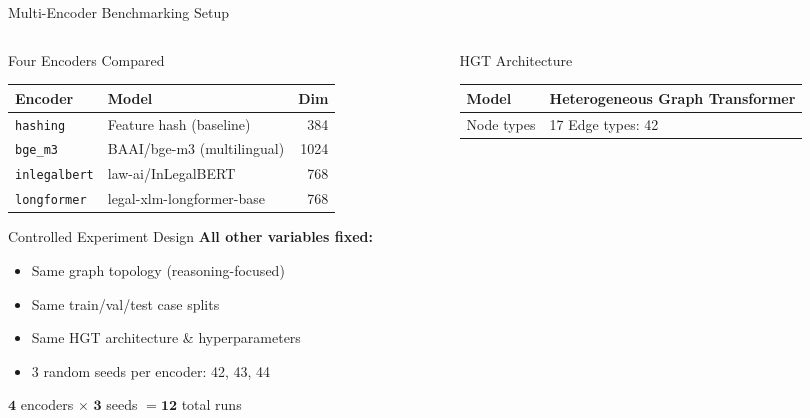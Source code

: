\documentclass[aspectratio=169, 9pt]{beamer}
\begin{document}
\begin{frame}{Multi-Encoder Benchmarking Setup}
  \begin{columns}[T]
    \begin{column}{0.50\textwidth}
      \begin{block}{Four Encoders Compared}
        \scriptsize\renewcommand{\arraystretch}{1.2}
        \begin{tabular}{p{1.8cm}p{3.2cm}r}
          \toprule
          \textbf{Encoder} & \textbf{Model} & \textbf{Dim}\\
          \midrule
          \texttt{hashing}     & Feature hash (baseline)     & 384\\
          \texttt{bge\_m3}     & BAAI/bge-m3 (multilingual)  & 1024\\
          \texttt{inlegalbert} & law-ai/InLegalBERT          & 768\\
          \texttt{longformer}  & legal-xlm-longformer-base   & 768\\
          \bottomrule
        \end{tabular}
      \end{block}
      \vspace{5pt}
      \begin{block}{Controlled Experiment Design}
        \small\textbf{All other variables fixed:}
        \begin{itemize}\scriptsize\setlength\itemsep{1pt}
          \item Same graph topology (reasoning-focused)
          \item Same train/val/test case splits
          \item Same HGT architecture \& hyperparameters
          \item 3 random seeds per encoder: 42, 43, 44
        \end{itemize}
        \vspace{3pt}
        $\mathbf{4}$ encoders $\times$ $\mathbf{3}$ seeds $= \mathbf{12}$ total runs
      \end{block}
    \end{column}
    \begin{column}{0.46\textwidth}
      \begin{block}{HGT Architecture}
        \small
        \begin{tabular}{ll}
          \toprule
          Model    & Heterogeneous Graph Transformer\\
          \midrule
          Node types & 17 \quad Edge types: 42\\

\end{tabular}
\end{block}
\end{column}
\end{columns}
\end{frame}
\end{document}
